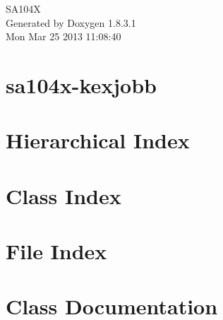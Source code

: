 \documentclass{book}
\begin{document}
\hypersetup{pageanchor=false,citecolor=blue}
\begin{titlepage}
\vspace*{7cm}
\begin{center}
{\Large S\-A104\-X }\\
\vspace*{1cm}
{\large Generated by Doxygen 1.8.3.1}\\
\vspace*{0.5cm}
{\small Mon Mar 25 2013 11:08:40}\\
\end{center}
\end{titlepage}
\clearemptydoublepage
{}
\tableofcontents
\clearemptydoublepage
{}
\hypersetup{pageanchor=true,citecolor=blue}
\chapter{sa104x-\/kexjobb}
\label{md_README}
\hypertarget{md_README}{}

\chapter{Hierarchical Index}

\chapter{Class Index}

\chapter{File Index}

\chapter{Class Documentation}








\end{document}
